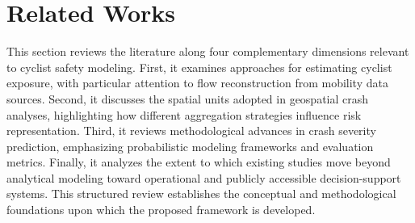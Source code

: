 \documentclass[preprint,12pt]{elsarticle}
\begin{document}

\section{Related Works}
This section reviews the literature along four complementary dimensions relevant to cyclist safety modeling. First, it examines approaches for estimating cyclist exposure, with particular attention to flow reconstruction from mobility data sources. Second, it discusses the spatial units adopted in geospatial crash analyses, highlighting how different aggregation strategies influence risk representation. Third, it reviews methodological advances in crash severity prediction, emphasizing probabilistic modeling frameworks and evaluation metrics. Finally, it analyzes the extent to which existing studies move beyond analytical modeling toward operational and publicly accessible decision-support systems. This structured review establishes the conceptual and methodological foundations upon which the proposed framework is developed.
\end{document}
